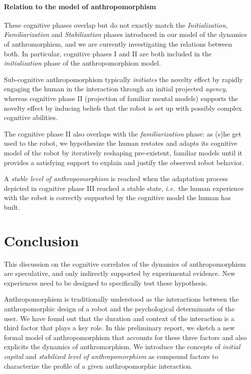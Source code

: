 \documentclass{sig-alternate-2013}
\newcommand{\ie}{{\textit{i.e.~}}}
\begin{document}
\paragraph{Relation to the model of anthropomorphism} 

These cognitive phases overlap but do not exactly match the
\emph{Initialization}, \emph{Familiarization} and \emph{Stabilization} phases
introduced in our model of the dynamics of anthromorphism, and we are currently
investigating the relations between both. In particular, cognitive phases I and
II are both included in the \emph{initialization} phase of the anthropomorphism
model.

Sub-cognitive anthropomorphism typically \emph{initiates} the novelty effect by
rapidly engaging the human in the interaction through an initial projected
\emph{agency}, whereas cognitive phase II (projection of familiar mental
models) supports the novelty effect by inducing beliefs that the robot is set
up with possibly complex cognitive abilities.

The cognitive phase II also overlaps with the \emph{familiarization} phase: as
(s)he get used to the robot, we hypothesize the human restates and adapts its
cognitive model of the robot by iteratively reshaping pre-existent, familiar
models until it provides a satisfying support to explain and justify the
observed robot behavior.

A \emph{stable level of anthropomorphism} is reached when the adaptation
process depicted in cognitive phase III reached a stable state, \ie the human
experience with the robot is correctly supported by the cognitive model the
human has built.

\section{Conclusion}
\label{sec:conclusion}

This discussion on the cognitive correlates of the dynamics
of anthropomorphism are speculative, and only indirectly supported by
experimental evidence. New experiences need to be designed to specifically test
these hypothesis.


Anthropomorphism is traditionally understood as the interactions between the
anthropomorphic design of a robot and the psychological determinants of the
user. We have found out that the duration and context of the interaction is a
third factor that plays a key role. In this preliminary report, we sketch a new
formal model of anthropomorphism that accounts for these three factors and also
explicits the dynamics of anthromorphism. We introduce the concepts of
\emph{initial capital} and \emph{stabilized level of anthropomorphism} as
compound factors to characterize the profile of a given anthropomorphic
interaction.
\end{document}
